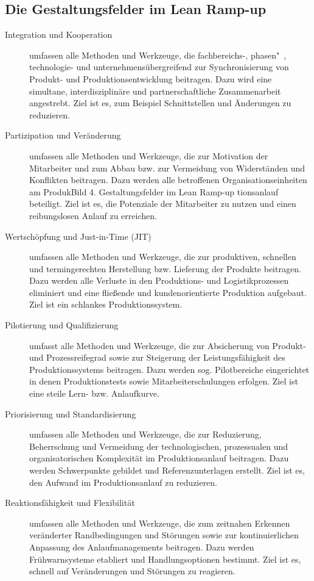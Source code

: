 \subsection*{Die Gestaltungsfelder im Lean Ramp-up}\label{appendix:dom11a:gf}
\begin{description}
\item[Integration und Kooperation] umfassen
alle Methoden und Werkzeuge, die
fachbereichs-, pha\-sen"~, technologie- und unternehmensübergreifend zur
Synchronisierung von Produkt- und
Produktionsentwicklung beitragen.
Dazu wird eine simultane, interdisziplinäre und partnerschaftliche Zusammenarbeit angestrebt. Ziel ist es,
zum Beispiel Schnittstellen und Änderungen zu reduzieren.

\item[Partizipation und Veränderung] umfassen alle Methoden und Werkzeuge,
die zur Motivation der Mitarbeiter
und zum Abbau bzw. zur Vermeidung
von Widerständen und Konflikten beitragen. Dazu werden alle betroffenen
Organisationseinheiten am ProdukBild 4. Gestaltungsfelder im Lean Ramp-up
tionsanlauf beteiligt. Ziel ist es, die
Potenziale der Mitarbeiter zu nutzen
und einen reibungslosen Anlauf zu erreichen.

 \item[Wertschöpfung und Just-in-Time (JIT)]
umfassen alle Methoden und Werkzeuge, die zur produktiven, schnellen
und termingerechten Herstellung
bzw. Lieferung der Produkte beitragen. Dazu werden alle Verluste in den
Produktions- und Logistikprozessen
eliminiert und eine fließende und
kundenorientierte Produktion aufgebaut. Ziel ist ein schlankes Produktionssystem.

 \item[Pilotierung und Qualifizierung] umfasst
alle Methoden und Werkzeuge, die
zur Absicherung von Produkt- und
Prozessreifegrad sowie zur Steigerung der Leistungsfähigkeit des Produktionssystems beitragen. Dazu
werden sog. Pilotbereiche eingerichtet in denen Produktionstests sowie
Mitarbeiterschulungen erfolgen. Ziel
ist eine steile Lern- bzw. Anlaufkurve.

 \item[Priorisierung und Standardisierung]
umfassen alle Methoden und Werkzeuge, die zur Reduzierung, Beherrschung und Vermeidung der technologischen, prozessualen und organisatorischen Komplexität im Produktionsanlauf beitragen. Dazu werden
Schwerpunkte gebildet und Referenzunterlagen erstellt. Ziel ist es, den
Aufwand im Produktionsanlauf zu reduzieren.

 \item[Reaktionsfähigkeit und Flexibilität] umfassen alle Methoden und Werkzeuge,
die zum zeitnahen Erkennen veränderter Randbedingungen und Störungen sowie zur kontinuierlichen Anpassung des Anlaufmanagements beitragen. Dazu werden Frühwarnsysteme etabliert und Handlungsoptionen
bestimmt. Ziel ist es, schnell auf Veränderungen und Störungen zu reagieren.


\end{description}
